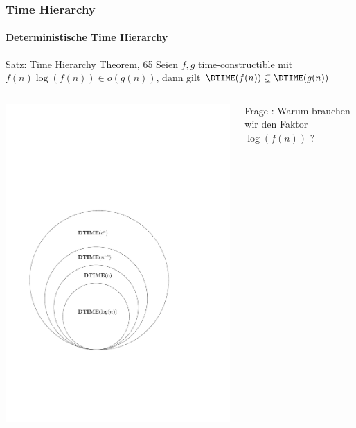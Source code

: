 \begin{frame}
	\frametitle{Time Hierarchy}
	\framesubtitle{Deterministische Time Hierarchy}
	
	\begin{KITinfoblock}{Satz: Time Hierarchy Theorem, 65}
	Seien $f, g$  time-constructible mit  
	$f(n)\log(f(n)) \in o(g(n))$, dann gilt
	$\DTIME(f(n)) \subsetneq \DTIME(g(n))$
		
	\end{KITinfoblock}
	\bigskip
	\begin{columns}
	\includegraphics[scale=0.3]{images/timehierarchy.pdf}
		
	\pause
	Frage : Warum brauchen wir den Faktor $\log(f(n))$ ?
	\end{columns}
\end{frame}

